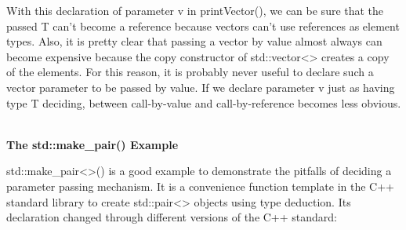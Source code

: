 With this declaration of parameter v in printVector(), we can be sure that the passed T can’t become a reference because vectors can’t use references as element types. Also, it is pretty clear that passing a vector by value almost always can become expensive because the copy constructor of std::vector<> creates a copy of the elements. For this reason, it is probably never useful to declare such a vector parameter to be passed by value. If we declare parameter v just as having type T deciding, between call-by-value and call-by-reference becomes less obvious.

\hspace*{\fill} \\ %
\noindent
\textbf{The std::make\_pair() Example}

std::make\_pair<>() is a good example to demonstrate the pitfalls of deciding a parameter passing mechanism. It is a convenience function template in the C++ standard library to create std::pair<> objects using type deduction. Its declaration changed through different versions of the C++ standard:

